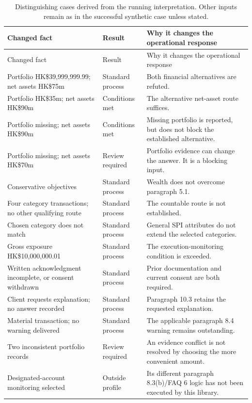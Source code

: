 \documentclass[12pt,a4paper,oneside,openany]{book}
\begin{document}
\begingroup\small
\begin{longtable}{P{0.38\textwidth}P{0.19\textwidth}P{0.33\textwidth}}
\caption{Distinguishing cases derived from the running interpretation. Other
inputs remain as in the successful synthetic case unless stated.}\label{tab:dry-cases}\\
\toprule Changed fact & Result & Why it changes the operational response \\\midrule
\endfirsthead
\toprule Changed fact & Result & Why it changes the operational response \\\midrule
\endhead
Portfolio HK\$39,999,999.99; net assets HK\$75m & Standard process & Both financial alternatives are refuted.\\
Portfolio HK\$35m; net assets HK\$90m & Conditions met & The alternative net-asset route suffices.\\
Portfolio missing; net assets HK\$90m & Conditions met & Missing portfolio is reported, but does not block the established alternative.\\
Portfolio missing; net assets HK\$70m & Review required & Portfolio evidence can change the answer. It is a blocking input.\\
Conservative objectives & Standard process & Wealth does not overcome paragraph 5.1.\\
Four category transactions; no other qualifying route & Standard process & The countable route is not established.\\
Chosen category does not match & Standard process & General SPI attributes do not extend the selected categories.\\
Gross exposure HK\$10,000,000.01 & Standard process & The execution-monitoring condition is exceeded.\\
Written acknowledgment incomplete, or consent withdrawn & Standard process & Prior documentation and current consent are both required.\\
Client requests explanation; no answer recorded & Standard process & Paragraph 10.3 retains the requested explanation.\\
Material transaction; no warning delivered & Standard process & The applicable paragraph 8.4 warning remains outstanding.\\
Two inconsistent portfolio records & Review required & An evidence conflict is not resolved by choosing the more convenient amount.\\
Designated-account monitoring selected & Outside profile & Its different paragraph 8.3(b)/FAQ 6 logic has not been executed by this library.\\
\bottomrule
\end{longtable}
\endgroup
\end{document}
